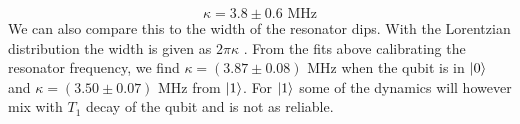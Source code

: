 \begin{equation}
    \kappa = 3.8 \pm 0.6 \text{ MHz}
\end{equation}
We can also compare this to the width of the resonator dips. With the Lorentzian distribution the width is given as $2 \pi \kappa$ \cite{krantz_quantum_2019}. From the fits above calibrating the resonator frequency, we find  $\kappa = (3.87 \pm 0.08) \text{ MHz}$ when the qubit is in $\ket{0}$ and $\kappa = (3.50 \pm 0.07) \text{ MHz}$ from $\ket{1}$. For $\ket{1}$ some of the dynamics will however mix with $T_1$ decay of the qubit and is not as reliable.   

